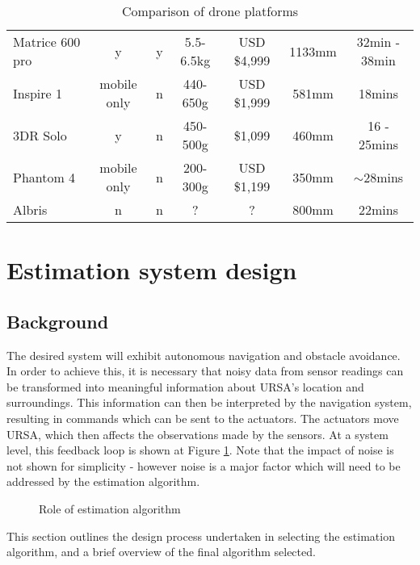 \documentclass[capstone_report.tex]{subfiles}
\begin{document}
\begin{landscape}
\begin{table}[H]
\begin{tabular}{@{}lcccccc@{}}
Matrice 600 pro        & y           & y   & 5.5-6.5kg          & USD \$4,999  & 1133mm & 32min - 38min              \\
Inspire 1              & mobile only & n   & 440-650g           & USD \$1,999  & 581mm  & 18mins                       \\
3DR Solo               & y           & n   & 450-500g           & \$1,099      & 460mm  & 16 - 25mins                 \\
Phantom 4              & mobile only & n   & 200-300g           & USD \$1,199  & 350mm  & $\sim$28mins                  \\
Albris                 & n           & n   & ?                  & ?            & 800mm  & 22mins                       \\ \bottomrule
\end{tabular}
\caption{Comparison of drone platforms \label{comparison}}
\end{table}
\end{landscape}
\pagebreak


\section{Estimation system design}
\subsection{Background}
The desired system will exhibit autonomous navigation and obstacle avoidance. In order to achieve this, it is necessary that noisy data from sensor readings can be transformed into meaningful information about URSA's location and surroundings. This information can then be interpreted by the navigation system, resulting in commands which can be sent to the actuators. The actuators move URSA, which then affects the observations made by the sensors. At a system level, this feedback loop is shown at Figure \ref{fig:estAlg1}. Note that the impact of noise is not shown for simplicity - however noise is a major factor which will need to be addressed by the estimation algorithm.

\begin{figure}[H]
\centering
	
	\caption{Role of estimation algorithm\label{fig:estAlg1}}
\end{figure}

This section outlines the design process undertaken in selecting the estimation algorithm, and a brief overview of the final algorithm selected. 
\end{document}
